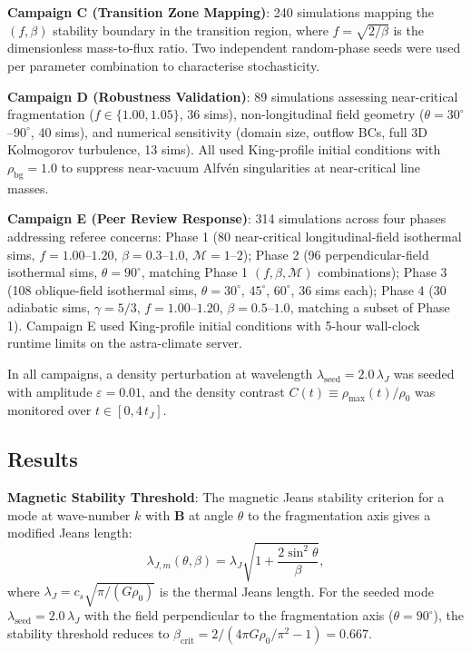 \documentclass[usenatbib]{rasti}
\begin{document}
\textbf{Campaign C (Transition Zone Mapping)}: 240 simulations mapping the $(f, \beta)$
stability boundary in the transition region, where $f = \sqrt{2/\beta}$ is the
dimensionless mass-to-flux ratio. Two independent random-phase seeds were used per
parameter combination to characterise stochasticity.

\textbf{Campaign D (Robustness Validation)}: 89 simulations assessing near-critical
fragmentation ($f \in \{1.00, 1.05\}$, 36 sims), non-longitudinal field geometry ($\theta
= 30^\circ$--$90^\circ$, 40 sims), and numerical sensitivity (domain size, outflow BCs,
full 3D Kolmogorov turbulence, 13 sims). All used King-profile initial conditions with
$\rho_\mathrm{bg} = 1.0$ to suppress near-vacuum Alfv\'{e}n singularities at near-critical
line masses.

\textbf{Campaign E (Peer Review Response)}: 314 simulations across four phases addressing
referee concerns: Phase 1 (80 near-critical longitudinal-field isothermal sims, $f =
1.00$--$1.20$, $\beta = 0.3$--$1.0$, $\mathcal{M} = 1$--$2$); Phase 2 (96 perpendicular-field
isothermal sims, $\theta = 90^\circ$, matching Phase 1 $(f,\beta,\mathcal{M})$
combinations); Phase 3 (108 oblique-field isothermal sims, $\theta = 30^\circ$, $45^\circ$,
$60^\circ$, 36 sims each); Phase 4 (30 adiabatic sims, $\gamma = 5/3$, $f = 1.00$--$1.20$,
$\beta = 0.5$--$1.0$, matching a subset of Phase 1). Campaign E used King-profile initial
conditions with 5-hour wall-clock runtime limits on the astra-climate server.

In all campaigns, a density perturbation at wavelength $\lambda_\mathrm{seed} = 2.0\,\lambda_J$
was seeded with amplitude $\varepsilon = 0.01$, and the density contrast $C(t) \equiv
\rho_\mathrm{max}(t)/\rho_0$ was monitored over $t \in [0, 4\,t_J]$.

\subsection{Results}
\label{sec:tc7_results}

\textbf{Magnetic Stability Threshold}: The magnetic Jeans stability criterion for a mode at
wave-number $k$ with $\mathbf{B}$ at angle $\theta$ to the fragmentation axis gives a
modified Jeans length:
\begin{equation}
\lambda_{J,m}(\theta,\beta) = \lambda_J \sqrt{1 + \frac{2\sin^2\theta}{\beta}},
\label{eq:magnetic_jeans}
\end{equation}
where $\lambda_J = c_s\sqrt{\pi/(G\rho_0)}$ is the thermal Jeans length. For the seeded
mode $\lambda_\mathrm{seed} = 2.0\,\lambda_J$ with the field perpendicular to the
fragmentation axis ($\theta = 90^\circ$), the stability threshold reduces to $\beta_\mathrm{crit}
= 2/(4\pi G\rho_0/\pi^2 - 1) = 0.667$.
\end{document}

